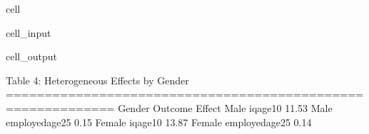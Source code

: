 \documentclass[letterpaper,10pt,english]{jupyterBook}
\begin{document}
\begin{sphinxuseclass}{cell}
\begin{sphinxVerbatimInput}
\begin{sphinxuseclass}{cell_input}
\begin{sphinxVerbatim}[commandchars=\\\{\}]
  
\end{sphinxVerbatim}

\end{sphinxuseclass}\end{sphinxVerbatimInput}
\begin{sphinxVerbatimOutput}

\begin{sphinxuseclass}{cell_output}
\begin{sphinxVerbatim}[commandchars=\\\{\}]
Table 4: Heterogeneous Effects by Gender
============================================================
Gender         Outcome Effect
  Male       iq\PYGZus{}age\PYGZus{}10  11.53
  Male employed\PYGZus{}age\PYGZus{}25   0.15
Female       iq\PYGZus{}age\PYGZus{}10  13.87
Female employed\PYGZus{}age\PYGZus{}25   0.14
\end{sphinxVerbatim}

\end{sphinxuseclass}\end{sphinxVerbatimOutput}

\end{sphinxuseclass}
\end{document}
